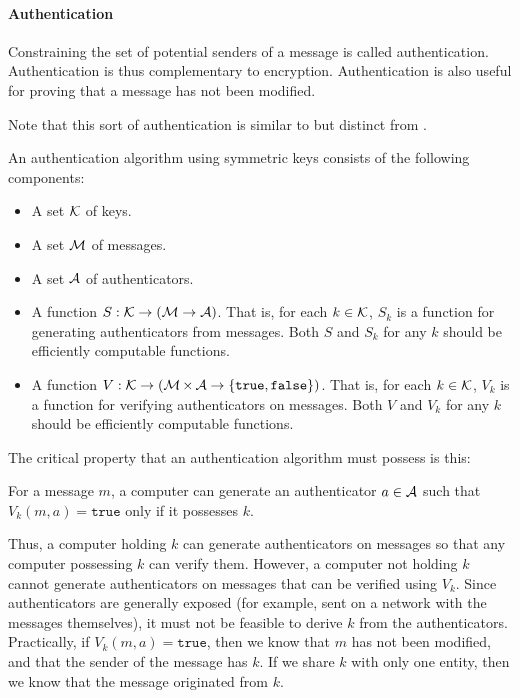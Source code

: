 \paragraph{Authentication}\label{par:Authentication}
Constraining the set of potential senders of a message is called authentication.
Authentication is thus complementary to encryption.
Authentication is also useful for proving that a message has not been modified.

Note that this sort of authentication is similar to but distinct from .

An authentication algorithm using symmetric keys consists of the following components:
\begin{itemize}[noitemsep]
\item A set $\operatorname{\mathcal{K}}$ of keys.
\item A set $\operatorname{\mathcal{M}}$ of messages.
\item A set $\operatorname{\mathcal{A}}$ of authenticators.
\item A function $S : \operatorname{\mathcal{K}} \to (\operatorname{\mathcal{M}} \to \operatorname{\mathcal{A}})$.
  That is, for each $k \in \operatorname{\mathcal{K}}$, $S_{k}$ is a function for generating authenticators from messages.
  Both $S$ and $S_{k}$ for any $k$ should be efficiently computable functions.
\item A function $V : \operatorname{\mathcal{K}} \to (\operatorname{\mathcal{M}} \times \operatorname{\mathcal{A}} \to \lbrace \mathtt{true}, \mathtt{false} \rbrace)$.
  That is, for each $k \in \operatorname{\mathcal{K}}$, $V_{k}$ is a function for verifying authenticators on messages.
  Both $V$ and $V_{k}$ for any $k$ should be efficiently computable functions.
\end{itemize}

The critical property that an authentication algorithm must possess is this:
\begin{blackbox}
  For a message $m$, a computer can generate an authenticator $a \in \operatorname{\mathcal{A}}$ such that $V_{k}(m, a) = \mathtt{true}$ only if it possesses $k$.
\end{blackbox}

Thus, a computer holding $k$ can generate authenticators on messages so that any computer possessing $k$ can verify them.
However, a computer not holding $k$ cannot generate authenticators on messages that can be verified using $V_{k}$.
Since authenticators are generally exposed (for example, sent on a network with the messages themselves), it must not be feasible to derive $k$ from the authenticators.
Practically, if $V_{k}(m, a) = \mathtt{true}$, then we know that $m$ has not been modified, and that the sender of the message has $k$.
If we share $k$ with only one entity, then we know that the message originated from $k$.

